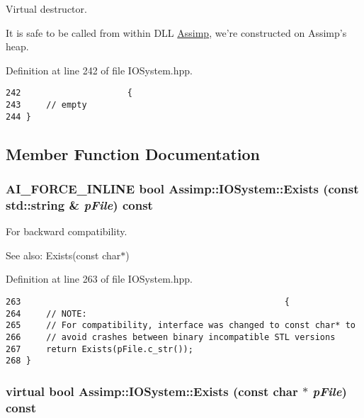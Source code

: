 Virtual destructor. 

It is safe to be called from within DLL \hyperlink{namespace_assimp}{Assimp}, we're constructed on Assimp's heap. 

Definition at line 242 of file IOSystem.hpp.

\begin{Code}\begin{verbatim}242                     {
243     // empty
244 }
\end{verbatim}
\end{Code}




\subsection{Member Function Documentation}
\hypertarget{class_assimp_1_1_i_o_system_7ae6cfaea4957408967463bfc3b84b27}{
\subsubsection[Exists]{\setlength{\rightskip}{0pt plus 5cm}AI\_\-FORCE\_\-INLINE bool Assimp::IOSystem::Exists (const std::string \& {\em pFile}) const}}
\label{class_assimp_1_1_i_o_system_7ae6cfaea4957408967463bfc3b84b27}


For backward compatibility. 

\begin{Desc}
\item[See also:]Exists(const char$\ast$) \end{Desc}


Definition at line 263 of file IOSystem.hpp.

\begin{Code}\begin{verbatim}263                                                    {
264     // NOTE:
265     // For compatibility, interface was changed to const char* to
266     // avoid crashes between binary incompatible STL versions
267     return Exists(pFile.c_str());
268 }
\end{verbatim}
\end{Code}


\hypertarget{class_assimp_1_1_i_o_system_79f5fe8d2dbe1056c9418f7de9a72445}{
\subsubsection[Exists]{\setlength{\rightskip}{0pt plus 5cm}virtual bool Assimp::IOSystem::Exists (const char $\ast$ {\em pFile}) const}}
\label{class_assimp_1_1_i_o_system_79f5fe8d2dbe1056c9418f7de9a72445}


